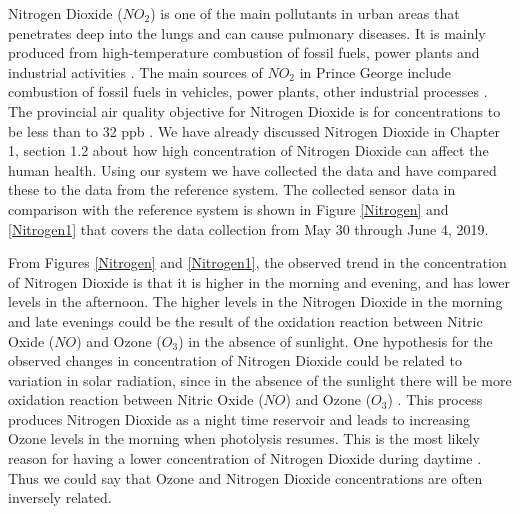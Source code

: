 Nitrogen Dioxide (${NO_2}$) is one of the main pollutants in urban areas that penetrates deep into the lungs and can cause pulmonary diseases. It is mainly produced from high-temperature combustion of fossil fuels, power plants and industrial activities \cite{EnvironmentalQualitySectionMoE2012}. The main sources of ${NO_2}$ in Prince George include combustion of fossil fuels in vehicles, power plants, other industrial processes \cite{Environment2016}. The provincial air quality objective for Nitrogen Dioxide is for concentrations to be  less than to 32 ppb \cite{Environment2016}. We have already discussed Nitrogen Dioxide in Chapter 1, section 1.2 about how high concentration of Nitrogen Dioxide can affect the human health. Using our system we have collected the data and have compared these to the data from the reference system. The collected sensor data in comparison with the reference system is shown in Figure \ref{Nitrogen} and \ref{Nitrogen1} that covers the data collection from May 30 through June 4, 2019. 

From Figures \ref{Nitrogen} and \ref{Nitrogen1}, the observed trend in the concentration of Nitrogen Dioxide is that it is higher in the morning and evening, and has lower levels in the afternoon. The higher levels in the Nitrogen Dioxide in the morning and late evenings could be the result of the oxidation reaction between Nitric Oxide ($NO$) and Ozone ($O_3$) in the absence of sunlight. One hypothesis for the observed changes in concentration of Nitrogen Dioxide could be related to variation in solar radiation, since in the absence of the sunlight there will be more oxidation reaction between Nitric Oxide ($NO$) and Ozone ($O_3$) \cite{Environment2010}. This process produces Nitrogen Dioxide as a night time reservoir and leads to increasing Ozone levels in the morning when photolysis resumes. This is the most likely reason for having a lower concentration of Nitrogen Dioxide during daytime \cite{rozbicka2014spatiotemporal}. Thus we could say that Ozone and Nitrogen Dioxide concentrations are often inversely related.  
    
